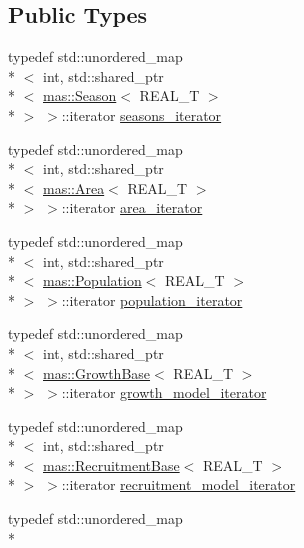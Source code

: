\subsection*{Public Types}
\begin{DoxyCompactItemize}
\item 
typedef std\-::unordered\-\_\-map\\*
$<$ int, std\-::shared\-\_\-ptr\\*
$<$ \hyperlink{structmas_1_1_season}{mas\-::\-Season}$<$ R\-E\-A\-L\-\_\-\-T $>$\\*
 $>$ $>$\-::iterator \hyperlink{classmas_1_1_information_a4ada3467c12527ed5400cc67e80e31f2}{seasons\-\_\-iterator}
\item 
typedef std\-::unordered\-\_\-map\\*
$<$ int, std\-::shared\-\_\-ptr\\*
$<$ \hyperlink{structmas_1_1_area}{mas\-::\-Area}$<$ R\-E\-A\-L\-\_\-\-T $>$\\*
 $>$ $>$\-::iterator \hyperlink{classmas_1_1_information_a6183f0d8819e3ecb50239da88d2cfdb3}{area\-\_\-iterator}
\item 
typedef std\-::unordered\-\_\-map\\*
$<$ int, std\-::shared\-\_\-ptr\\*
$<$ \hyperlink{classmas_1_1_population}{mas\-::\-Population}$<$ R\-E\-A\-L\-\_\-\-T $>$\\*
 $>$ $>$\-::iterator \hyperlink{classmas_1_1_information_a61b09f185a136338d02e6307134677d1}{population\-\_\-iterator}
\item 
typedef std\-::unordered\-\_\-map\\*
$<$ int, std\-::shared\-\_\-ptr\\*
$<$ \hyperlink{structmas_1_1_growth_base}{mas\-::\-Growth\-Base}$<$ R\-E\-A\-L\-\_\-\-T $>$\\*
 $>$ $>$\-::iterator \hyperlink{classmas_1_1_information_aa19e91aec674c826cbb84ebdc1d17be7}{growth\-\_\-model\-\_\-iterator}
\item 
typedef std\-::unordered\-\_\-map\\*
$<$ int, std\-::shared\-\_\-ptr\\*
$<$ \hyperlink{structmas_1_1_recruitment_base}{mas\-::\-Recruitment\-Base}$<$ R\-E\-A\-L\-\_\-\-T $>$\\*
 $>$ $>$\-::iterator \hyperlink{classmas_1_1_information_a3948a990e86ca1174a515134fbd78dc5}{recruitment\-\_\-model\-\_\-iterator}
\item 
typedef std\-::unordered\-\_\-map\\*

\end{DoxyCompactItemize}
